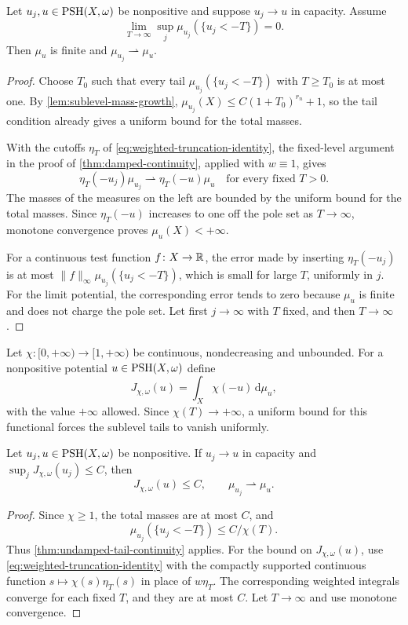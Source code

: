 \begin{theorem}\label{thm:undamped-tail-continuity}
Let $u_j,u\in\mathrm{PSH}(X,\omega)$ be nonpositive and suppose $u_j\to u$ in capacity. Assume
\[
 \lim_{T\to\infty}\sup_j\mu_{u_j}(\{u_j<-T\})=0.
\]
Then $\mu_u$ is finite and $\mu_{u_j}\rightharpoonup\mu_u$.
\end{theorem}
\begin{proof}
Choose $T_0$ such that every tail $\mu_{u_j}(\{u_j<-T\})$ with $T\geq T_0$ is at most one. By \cref{lem:sublevel-mass-growth}, $\mu_{u_j}(X)\leq C(1+T_0)^{r_n}+1$, so the tail condition already gives a uniform bound for the total masses.

With the cutoffs $\eta_T$ of \eqref{eq:weighted-truncation-identity}, the fixed-level argument in the proof of \cref{thm:damped-continuity}, applied with $w\equiv1$, gives
\[
 \eta_T(-u_j)\mu_{u_j}\rightharpoonup\eta_T(-u)\mu_u
 \quad\text{for every fixed }T>0.
\]
The masses of the measures on the left are bounded by the uniform bound for the total masses. Since $\eta_T(-u)$ increases to one off the pole set as $T\to\infty$, monotone convergence proves $\mu_u(X)<+\infty$.

For a continuous test function $f\colon X\to\mathbb R$, the error made by inserting $\eta_T(-u_j)$ is at most
$\|f\|_\infty\mu_{u_j}(\{u_j<-T\})$, which is small for large $T$, uniformly in $j$. For the limit potential, the corresponding error tends to zero because $\mu_u$ is finite and does not charge the pole set. Let first $j\to\infty$ with $T$ fixed, and then $T\to\infty$.
\end{proof}

Let $\chi\colon [0,+\infty)\to[1,+\infty)$ be continuous, nondecreasing and unbounded. For a nonpositive potential $u\in\mathrm{PSH}(X,\omega)$ define
\[
 J_{\chi,\omega}(u)=\int_X\chi(-u)\,\mathrm{d}\mu_u,
\]
with the value $+\infty$ allowed. Since $\chi(T)\to+\infty$, a uniform bound for this functional forces the sublevel tails to vanish uniformly.

\begin{corollary}\label{cor:integrability-continuity}
Let $u_j,u\in\mathrm{PSH}(X,\omega)$ be nonpositive. If $u_j\to u$ in capacity and $\sup_jJ_{\chi,\omega}(u_j)\leq C$, then
\[
 J_{\chi,\omega}(u)\leq C,\qquad
 \mu_{u_j}\rightharpoonup\mu_u.
\]
\end{corollary}
\begin{proof}
Since $\chi\geq1$, the total masses are at most $C$, and
\[
 \mu_{u_j}(\{u_j<-T\})\leq C/\chi(T).
\]
Thus \cref{thm:undamped-tail-continuity} applies. For the bound on $J_{\chi,\omega}(u)$, use \eqref{eq:weighted-truncation-identity} with the compactly supported continuous function $s\mapsto\chi(s)\eta_T(s)$ in place of $w\eta_T$. The corresponding weighted integrals converge for each fixed $T$, and they are at most $C$. Let $T\to\infty$ and use monotone convergence.
\end{proof}

